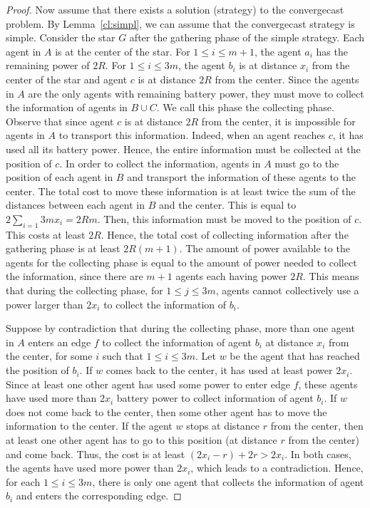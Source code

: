 \documentclass{article}
\newcommand\strat{\mbox{strategy}\xspace}
\newcommand\ccast{convergecast\xspace}
\begin{document}
\begin{proof}
\medskip

Now assume that there exists a solution (strategy) to the convergecast problem.
By Lemma~\ref{cl:simpl}, we can assume that the {\ccast} {\strat} is simple. Consider the star $G$ after the gathering phase of the simple {\strat}. Each agent in $A$ is at the center of the star. For $1\leq i\leq m+1$, the agent $a_i$ has the remaining power of $2R$. For $1\leq i\leq 3m$, the agent $b_i$ is at distance $x_i$ from the center of the star and agent $c$ is at distance $2R$ from the center. Since the agents in $A$ are the only agents with remaining battery power, they must move to collect the information of agents in $B\cup C$. We call this phase the collecting phase. Observe that since agent $c$ is at distance $2R$ from the center, it is impossible for agents in $A$ to transport this information. Indeed, when an agent reaches $c$, it has used all its battery power. Hence, the entire information must be collected at the position of $c$. In order to collect the information, agents in $A$ must go to the position of each agent in $B$ and transport the information of these agents to the center. The total cost to move these information is at least twice the sum of the distances between each agent in $B$ and the center. This is equal to $2\sum_{i=1}{3m}x_i=2Rm$. Then, this information must be moved to the position of $c$. This costs at least $2R$. Hence, the total cost of collecting information after the gathering phase is at least $2R(m+1)$. The amount of power available to the agents for the collecting phase is equal to the amount of power needed to collect the information, since there are $m+1$ agents each having power $2R$. This means that during the collecting phase, for $1\leq j\leq 3m$, agents cannot collectively use a power larger than $2x_i$ to collect the information of $b_i$. 

Suppose by contradiction that during the collecting phase, more than one agent in $A$ enters an edge $f$ to collect the information of agent $b_i$ at distance $x_i$ from the center, for some $i$ such that $1\leq i\leq 3m$.
Let $w$ be the agent that has reached the position of $b_i$. If $w$ comes back to the center, it has used at least power  $2x_i$. Since at least one other agent has used some power to enter edge $f$, these agents have used more than $2x_i$ battery power to collect information of agent $b_i$. If $w$ does not come back to the center, then some other agent has to move the information to the center. If the agent $w$ stops at distance $r$ from the center, then at least one other agent has to go to this position (at distance $r$ from the center) and come back. Thus, the cost is at least $(2x_i-r)+2r>2x_i$. In both cases, the agents have used more power than $2x_i$, which leads to a contradiction. Hence, for each $1\leq i\leq 3m$, there is only one agent that collects the information of agent $b_i$ and enters the corresponding edge. 


\end{proof}
\end{document}

